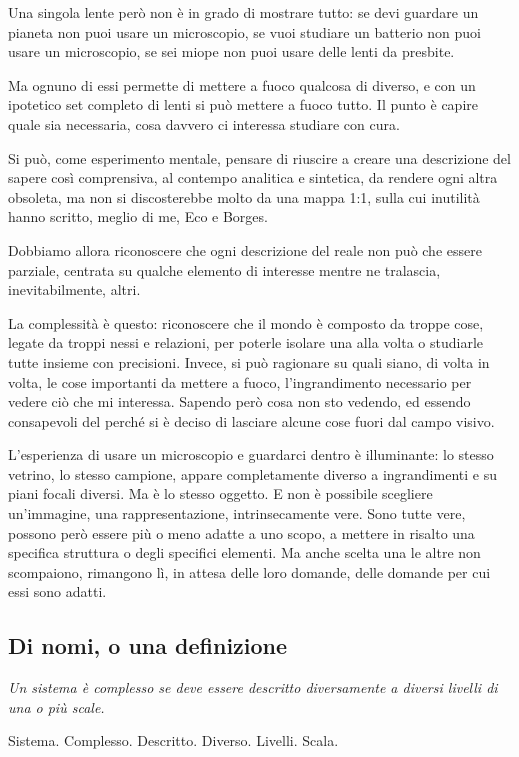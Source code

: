 \documentclass[a4paper, headings=standardclasses]{scrartcl}
\begin{document}
Una singola lente però non è in grado di mostrare tutto: se devi guardare un pianeta non puoi usare un microscopio, se vuoi studiare un batterio non puoi usare un microscopio, se sei miope non puoi usare delle lenti da presbite.

Ma ognuno di essi permette di mettere a fuoco qualcosa di diverso, e con un ipotetico set completo di lenti si può mettere a fuoco tutto. Il punto è capire quale sia necessaria, cosa davvero ci interessa studiare con cura.

Si può, come esperimento mentale, pensare di riuscire a creare una descrizione del sapere così comprensiva, al contempo analitica e sintetica, da rendere ogni altra obsoleta, ma non si discosterebbe molto da una mappa 1:1, sulla cui inutilità hanno scritto, meglio di me, Eco e Borges.

Dobbiamo allora riconoscere che ogni descrizione del reale non può che essere parziale, centrata su qualche elemento di interesse mentre ne tralascia, inevitabilmente, altri.

La complessità è questo: riconoscere che il mondo è composto da troppe cose, legate da troppi nessi e relazioni, per poterle isolare una alla volta o studiarle tutte insieme con precisioni. Invece, si può ragionare su quali siano, di volta in volta, le cose importanti da mettere a fuoco, l'ingrandimento necessario per vedere ciò che mi interessa. Sapendo però cosa non sto vedendo, ed essendo consapevoli del perché si è deciso di lasciare alcune cose fuori dal campo visivo.

L'esperienza di usare un microscopio e guardarci dentro è illuminante: lo stesso vetrino, lo stesso campione, appare completamente diverso a ingrandimenti e su piani focali diversi. Ma è lo stesso oggetto. E non è possibile scegliere un'immagine, una rappresentazione, intrinsecamente vere. Sono tutte vere, possono però essere più o meno adatte a uno scopo, a mettere in risalto una specifica struttura o degli specifici elementi. Ma anche scelta una le altre non scompaiono, rimangono lì, in attesa delle loro domande, delle domande per cui essi sono adatti.

\subsection{Di nomi, o una definizione}
\textit{Un sistema è complesso se deve essere descritto diversamente a diversi livelli di una o più scale.}

Sistema. Complesso. Descritto. Diverso. Livelli. Scala.
\end{document}
